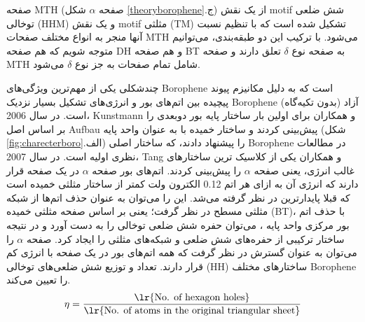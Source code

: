 صفحه \gls{MTH} (صفحه $\alpha$ شکل \ref{theoryborophene}.ج) از یک نقش \gls{motif} شش ضلعی توخالی (\gls{HHM}) و یک نقش \gls{motif} مثلثی (\gls{TM}) تشکیل شده است که با تنظیم نسبت آنها منجر به انواع مختلف صفحات \gls{MTH} می‌شود. \cite{yangInitioPredictionStable2008, tianPlanar2hB26H82013, penevPolymorphismTwoDimensionalBoron2012, tangFirstprinciplesStudyBoron2010, lauThermodynamicStabilityNovel2008, lauStabilityElectronicProperties2007} با ترکیب این دو طبقه‌بندی، می‌توانیم متوجه شویم که هم صفحه \gls{DH} و هم صفحه \gls{BT} به صفحه نوع $\delta$ تعلق دارند و صفحه \gls{MTH} شامل تمام صفحات به جز نوع $\delta$ می‌شود.

چندشکلی یکی از مهم‌ترین ویژگی‌های \gls{Borophene} است که به دلیل مکانیزم پیوند پیچیده بین اتم‌های بور و انرژی‌های تشکیل بسیار نزدیک \gls{Borophene} آزاد (بدون تکیه‌گاه) است. در سال 2006، \gls{Kunstmann} و همکاران \cite{kunstmannBroadBoronSheets2006} برای اولین بار ساختار پایه بور دوبعدی را بر اساس اصل \gls{Aufbau} پیش‌بینی کردند و ساختار خمیده با  به عنوان واحد پایه (شکل \ref{fig:charecterboro}.الف) را پیشنهاد دادند، که ساختار اصلی \gls{Borophene} در مطالعات نظری اولیه است. در سال 2007، \gls{Tang} و همکاران \cite{tangSelfdopingBoronSheets2009, tangNovelPrecursorsBoron2007} یکی از کلاسیک‌ ترین ساختارهای غالب انرژی، یعنی صفحه $\alpha$ را پیش‌بینی کردند. اتم‌های بور صفحه $\alpha$ در یک صفحه قرار دارند که انرژی آن به ازای هر اتم 0.12 الکترون ولت کمتر از ساختار مثلثی خمیده است که قبلا پایدارترین در نظر گرفته می‌شد. این را می‌توان به عنوان حذف اتم‌ها از شبکه مثلثی مسطح در نظر گرفت؛ یعنی بر اساس صفحه مثلثی خمیده (\gls{BT})، با حذف اتم بور مرکزی واحد پایه ، می‌توان حفره شش ضلعی توخالی را به دست آورد و در نتیجه ساختار ترکیبی از حفره‌های شش ضلعی و شبکه‌های مثلثی را ایجاد کرد. صفحه $\alpha$ را می‌توان به عنوان گسترش  در نظر گرفت که همه اتم‌های بور در یک صفحه با انرژی کم قرار دارند. تعداد و توزیع شش ضلعی‌های توخالی (\gls{HH}) ساختارهای مختلف \gls{Borophene} را تعیین می‌کند.
\begin{equation}
    \eta=\frac{\text{\lr{No. of hexagon holes}}}{\text{\lr{No. of atoms in the original triangular sheet}}}
\end{equation}

